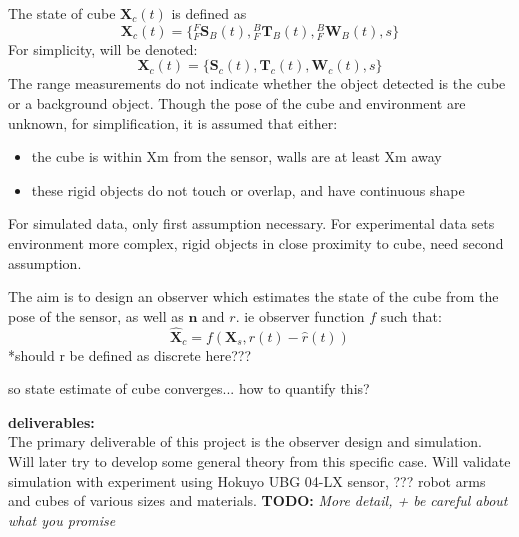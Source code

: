 The state of cube $\mathbf{X}_{c}(t)$ is defined as 
\begin{equation}
	\mathbf{X}_{c}(t) = 
	\{{^{F}_{F}\mathbf{S}^{}_{B}(t)},{^{B}_{F}\mathbf{T}^{}_{B}(t)},{^{B}_{F}\mathbf{W}^{}_{B}(t)},
	s\}
\end{equation}
For simplicity, will be denoted:
\begin{equation}
	\mathbf{X}_{c}(t) = 
	\{\mathbf{S}_{c}(t),\mathbf{T}_{c}(t),\mathbf{W}_{c}(t),s\}
\end{equation}
The range measurements do not indicate whether the object detected is the cube or a background object. Though the pose of the cube and environment are unknown, for simplification, it is assumed that either:
\begin{itemize}
\item the cube is within Xm from the sensor, walls are at least Xm away
\item these rigid objects do not touch or overlap, and have continuous shape
\end{itemize}
For simulated data, only first assumption necessary. For experimental data sets environment more complex, rigid objects in close proximity to cube, need second assumption. 

The aim is to design an observer which estimates the state of the cube from the pose of the sensor, as well as $\mathbf{n}$ and $r$. ie observer function $f$ such that:
\begin{equation}
	\hat{\mathbf{X}}_{c} = f(\mathbf{X}_{s},r(t)-\hat{r}(t))
\end{equation}
*should r be defined as discrete here???

so state estimate of cube converges... how to quantify this?









\textbf{deliverables:} \\
The primary deliverable of this project is the observer design and simulation. Will later try to develop some general theory from this specific case. Will validate simulation with experiment using Hokuyo UBG 04-LX sensor, ??? robot arms and cubes of various sizes and materials.
\textbf{TODO:} \textit{More detail, + be careful about what you promise}

